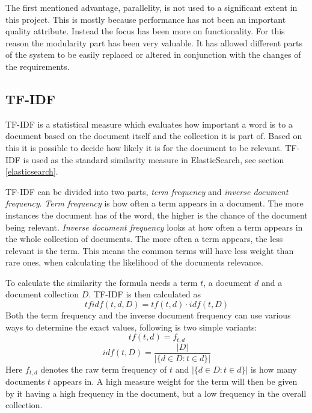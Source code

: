 The first mentioned advantage, parallelity, is not used to a significant extent in this project. This is mostly because performance has not been an important quality attribute. Instead the focus has been more on functionality. For this reason the modularity part has been very valuable. It has allowed different parts of the system to be easily replaced or altered in conjunction with the changes of the requirements.


\subsection{TF-IDF} \label{tf/idf}
TF-IDF is a statistical measure which evaluates how important a word is to a document based on the document itself and the collection it is part of. Based on this it is possible to decide how likely it is for the document to be relevant. TF-IDF is used as the standard similarity measure in ElasticSearch, see section \ref{elasticsearch}.

TF-IDF can be divided into two parts, \textit{term frequency} and \textit{inverse document frequency}. \textit{Term frequency} is how often a term appears in a document. The more instances the document has of the word, the higher is the chance of the document being relevant. \textit{Inverse document frequency} looks at how often a term appears in the whole collection of documents. The more often a term appears, the less relevant is the term. This means the common terms will have less weight than rare ones, when calculating the likelihood of the documents relevance.

To calculate the similarity the formula needs a term \(t\), a document \(d\) and a document collection \(D\). TF-IDF is then calculated as
\[tfidf(t, d, D) = tf(t, d)  \cdot idf(t, D)\]
Both the term frequency and the inverse document frequency can use various ways to determine the exact values, following is two simple variants: 
\[tf(t, d) = f_{t,d}\] 
\[idf(t, D) = \frac{|D|}{ |\{d \in D: t \in d\}| }\]
Here \(f_{t,d}\) denotes the raw term frequency of \(t\) and \( |\{d \in D: t \in d\}| \) is how many documents \(t\) appears in. A high measure weight for the term will then be given by it having a high frequency in the document, but a low frequency in the overall collection.



\cleardoublepage